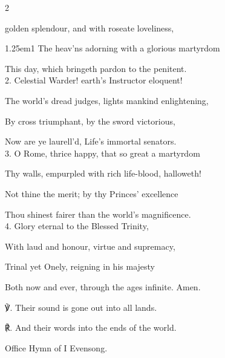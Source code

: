 \begin{paracol}{2}
\sloppy

\firstEvensong
{}

\firstEvensongHymn
{} golden splendour, and with roseate loveliness,


\begin{hangparas}{1.25em}{1}
The heav'ns adorning with a glorious martyrdom

This day, which bringeth pardon to the penitent.\\

2. Celestial Warder! earth’s Instructor eloquent!

The world's dread judges, lights mankind enlightening,

By cross triumphant, by the sword victorious,

Now are ye laurell'd, Life’s immortal senators.\\

3. O Rome, thrice happy, that so great a martyrdom

Thy walls, empurpled with rich life-blood, halloweth!

Not thine the merit; by thy Princes' excellence

Thou shinest fairer than the world's magnificence.\\

4. Glory eternal to the Blessed Trinity,

With laud and honour, virtue and supremacy,

Trinal yet Onely, reigning in his majesty

Both now and ever, through the ages infinite. Amen.\\
\end{hangparas}

℣. Their sound is gone out into all lands.

℟. And their words into the ends of the world.


\secondEvensong
{}

\begin{rubric}
	Office Hymn of I Evensong.
\end{rubric}


\end{paracol}
